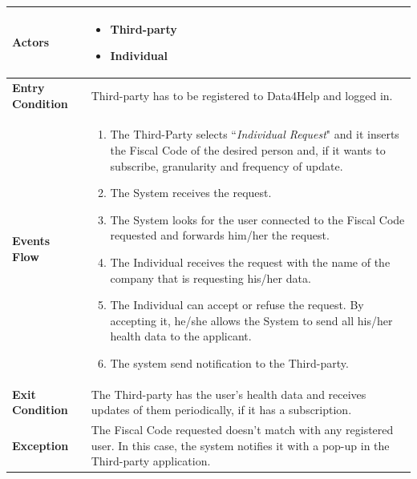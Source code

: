             \begin{table}[H]
            	\centering
                
                \begin{tabular}{|p{3cm}|p{8.2cm}|}
                    \hline
                    \textbf{Actors} &  \begin{itemize}
                                            \item Third-party
                                            \item Individual
                                        \end{itemize}\\
                     \hline
                    \textbf{Entry Condition} & Third-party has to be registered to Data4Help and logged in.\\
                     \hline
                    \textbf{Events Flow} & \begin{enumerate}
                                                \item The Third-Party selects ``\emph{Individual Request}" and it inserts the Fiscal Code of the desired person and, if it wants to subscribe, granularity and frequency of update.
                                                \item The System receives the request.
                                                \item The System looks for the user connected to the Fiscal Code requested and forwards him/her the request.
                                                \item The Individual receives the request with the name of the company that is requesting his/her data.
                                                 \item The Individual can accept or refuse the request. By accepting it, he/she allows the System to send all his/her health data to the applicant.
                                                 \item The system send notification to the Third-party.
                                            \end{enumerate}\\
                     \hline
                    \textbf{Exit Condition} & The Third-party has the user's health data and receives updates of them periodically, if it has a subscription. \\
                     \hline
                    \textbf{Exception} & The Fiscal Code requested doesn't match with any registered user. In this case, the system notifies it with a pop-up in the Third-party application.\\
                     \hline
                \end{tabular}  
            \end{table} 
            
